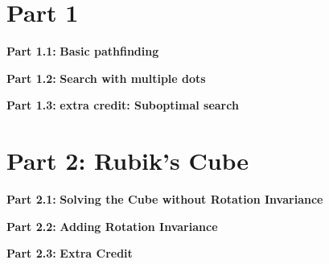 

\usepackage{graphicx, amssymb, amsmath, listings, float, mathtools}
\usepackage{color, url}
\lstset{language = Python}
\lstset{breaklines}
\lstset{extendedchars=false}

\oddsidemargin 0in
\evensidemargin 0in
\textwidth 6.5in
\topmargin -0.6in
\textheight 9.0in




\section*{\Large Part 1}
\begin{description}
\item{\bf \large Part 1.1: } \bf Basic pathfinding \\


\item{\bf \large Part 1.2: } \bf Search with multiple dots \\


\item{\bf \large Part 1.3: } \bf extra credit: Suboptimal search \\


\end{description}

\newpage
\section*{\Large Part 2: Rubik's Cube}
\begin{description}
\item{\bf \large Part 2.1: } \bf Solving the Cube without Rotation Invariance \\


\item{\bf \large Part 2.2: } \bf Adding Rotation Invariance \\


\item{\bf \large Part 2.3: } \bf Extra Credit \\


\end{description}


\clearpage

%
%
%



